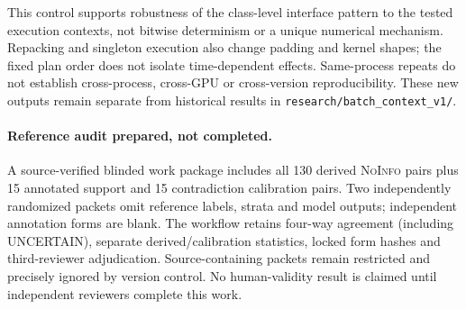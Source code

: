 This control supports robustness of the class-level interface pattern to the tested execution contexts, not bitwise determinism or a unique numerical mechanism. Repacking and singleton execution also change padding and kernel shapes; the fixed plan order does not isolate time-dependent effects. Same-process repeats do not establish cross-process, cross-GPU or cross-version reproducibility. These new outputs remain separate from historical results in \texttt{research/batch\_context\_v1/}.

\paragraph{Reference audit prepared, not completed.} A source-verified blinded work package includes all 130 derived \textsc{NoInfo} pairs plus 15 annotated support and 15 contradiction calibration pairs. Two independently randomized packets omit reference labels, strata and model outputs; independent annotation forms are blank. The workflow retains four-way agreement (including UNCERTAIN), separate derived/calibration statistics, locked form hashes and third-reviewer adjudication. Source-containing packets remain restricted and precisely ignored by version control. No human-validity result is claimed until independent reviewers complete this work.
